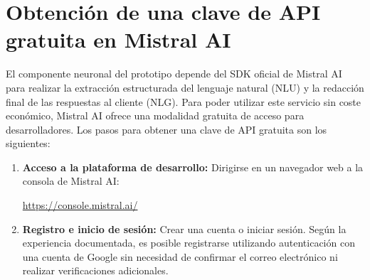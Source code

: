 \section{Obtención de una clave de API gratuita en Mistral AI}

El componente neuronal del prototipo depende del SDK oficial de Mistral AI para realizar la extracción estructurada del lenguaje natural (NLU) y la redacción final de las respuestas al cliente (NLG). Para poder utilizar este servicio sin coste económico, Mistral AI ofrece una modalidad gratuita de acceso para desarrolladores. Los pasos para obtener una clave de API gratuita son los siguientes:

\begin{enumerate}
    \item \textbf{Acceso a la plataforma de desarrollo:} Dirigirse en un navegador web a la consola de Mistral AI:
    \begin{center}
    \url{https://console.mistral.ai/}
    \end{center}

    \item \textbf{Registro e inicio de sesión:} Crear una cuenta o iniciar sesión. Según la experiencia documentada, es posible registrarse utilizando autenticación con una cuenta de Google sin necesidad de confirmar el correo electrónico ni realizar verificaciones adicionales.


\end{enumerate}
